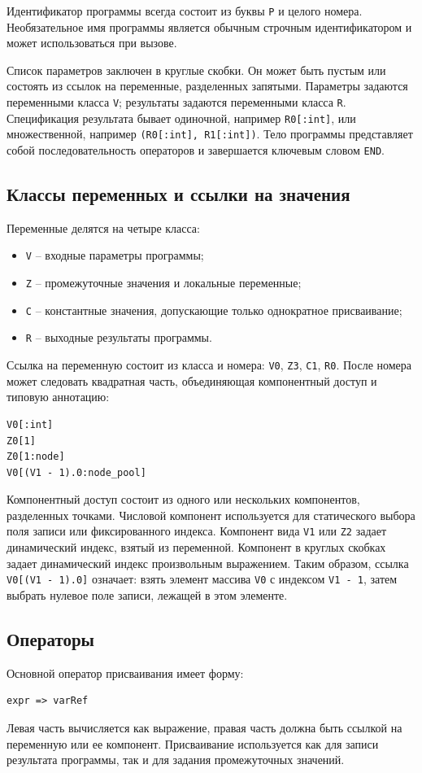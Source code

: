 Идентификатор программы всегда состоит из буквы \texttt{P} и целого номера.
Необязательное имя программы является обычным строчным идентификатором и может использоваться при вызове.

Список параметров заключен в круглые скобки.
Он может быть пустым или состоять из ссылок на переменные, разделенных запятыми.
Параметры задаются переменными класса \texttt{V}; результаты задаются переменными класса \texttt{R}.
Спецификация результата бывает одиночной, например \texttt{R0[:int]}, или множественной, например \texttt{(R0[:int], R1[:int])}.
Тело программы представляет собой последовательность операторов и завершается ключевым словом \texttt{END}.

\subsection{Классы переменных и ссылки на значения}
Переменные делятся на четыре класса:
\begin{itemize}
	\item \texttt{V} -- входные параметры программы;
	\item \texttt{Z} -- промежуточные значения и локальные переменные;
	\item \texttt{C} -- константные значения, допускающие только однократное присваивание;
	\item \texttt{R} -- выходные результаты программы.
\end{itemize}

Ссылка на переменную состоит из класса и номера: \texttt{V0}, \texttt{Z3}, \texttt{C1}, \texttt{R0}.
После номера может следовать квадратная часть, объединяющая компонентный доступ и типовую аннотацию:
\begin{verbatim}
V0[:int]
Z0[1]
Z0[1:node]
V0[(V1 - 1).0:node_pool]
\end{verbatim}

Компонентный доступ состоит из одного или нескольких компонентов, разделенных точками.
Числовой компонент используется для статического выбора поля записи или фиксированного индекса.
Компонент вида \texttt{V1} или \texttt{Z2} задает динамический индекс, взятый из переменной.
Компонент в круглых скобках задает динамический индекс произвольным выражением.
Таким образом, ссылка \texttt{V0[(V1 - 1).0]} означает: взять элемент массива \texttt{V0} с индексом \texttt{V1 - 1}, затем выбрать нулевое поле записи, лежащей в этом элементе.

\subsection{Операторы}
Основной оператор присваивания имеет форму:
\begin{verbatim}
expr => varRef
\end{verbatim}
Левая часть вычисляется как выражение, правая часть должна быть ссылкой на переменную или ее компонент.
Присваивание используется как для записи результата программы, так и для задания промежуточных значений.

